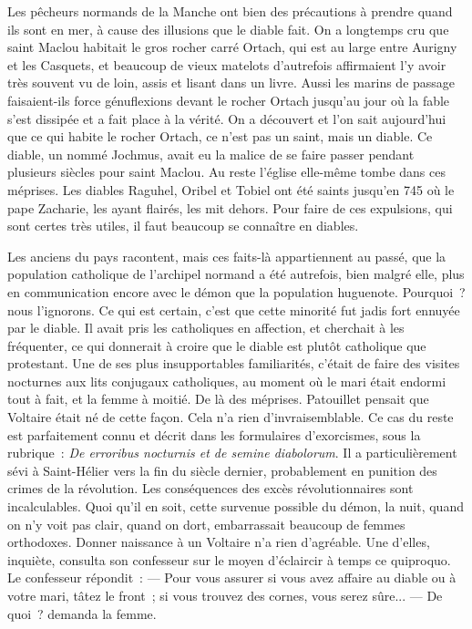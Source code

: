 \documentclass[french,twoside]{book} %
\begin{document}
Les pêcheurs normands de la Manche ont bien des précautions à prendre quand ils sont en mer, à cause  des illusions que le diable fait. On a longtemps cru que saint Maclou habitait le gros rocher carré Ortach, qui est au large entre Aurigny et les Casquets, et beaucoup de vieux matelots d’autrefois affirmaient l’y avoir très souvent vu de loin, assis et lisant dans un livre. Aussi les marins de passage faisaient-ils force génuflexions devant le rocher Ortach jusqu’au jour où la fable s’est dissipée et a fait place à la vérité. On a découvert et l’on sait aujourd’hui que ce qui habite le rocher Ortach, ce n’est pas un saint, mais un diable. Ce diable, un nommé Jochmus, avait eu la malice de se faire passer pendant plusieurs siècles pour saint Maclou. Au reste l’église elle-même tombe dans ces méprises. Les diables Raguhel, Oribel et Tobiel ont été saints jusqu’en 745 où le pape Zacharie, les ayant flairés, les mit dehors. Pour faire de ces expulsions, qui sont certes très utiles, il faut beaucoup se connaître en diables.\par
Les anciens du pays racontent, mais ces faits-là appartiennent au passé, que la population catholique de l’archipel normand a été autrefois, bien malgré elle, plus en communication encore avec le démon que la population huguenote. Pourquoi ? nous l’ignorons. Ce qui est certain, c’est que cette minorité fut jadis fort ennuyée par le diable. Il avait pris les catholiques en affection, et cherchait à les fréquenter, ce qui donnerait à croire que le diable est plutôt catholique que protestant. Une de ses plus insupportables familiarités, c’était de faire des visites nocturnes aux lits conjugaux catholiques, au moment où le mari était endormi tout  à fait, et la femme à moitié. De là des méprises. Patouillet pensait que Voltaire était né de cette façon. Cela n’a rien d’invraisemblable. Ce cas du reste est parfaitement connu et décrit dans les formulaires d’exorcismes, sous la rubrique : \emph{De erroribus nocturnis et de semine diabolorum}. Il a particulièrement sévi à Saint-Hélier vers la fin du siècle dernier, probablement en punition des crimes de la révolution. Les conséquences des excès révolutionnaires sont incalculables. Quoi qu’il en soit, cette survenue possible du démon, la nuit, quand on n’y voit pas clair, quand on dort, embarrassait beaucoup de femmes orthodoxes. Donner naissance à un Voltaire n’a rien d’agréable. Une d’elles, inquiète, consulta son confesseur sur le moyen d’éclaircir à temps ce quiproquo. Le confesseur répondit : — Pour vous assurer si vous avez affaire au diable ou à votre mari, tâtez le front ; si vous trouvez des cornes, vous serez sûre... — De quoi ? demanda la femme.\par
\end{document}
